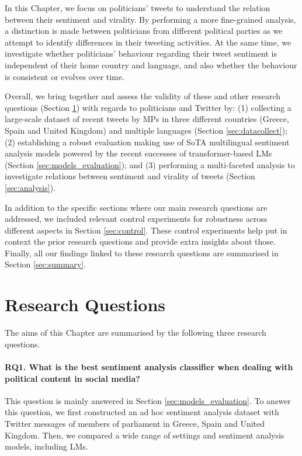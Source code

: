 In this Chapter, we focus on politicians' tweets to understand the relation between their sentiment and virality. By performing a more fine-grained analysis, a distinction is made between politicians from different political parties as we attempt to identify differences in their tweeting activities. At the same time, we investigate whether politicians' behaviour regarding their tweet sentiment is independent of their home country and language, and also whether the behaviour is consistent or evolves over time.

Overall, we bring together and assess the validity of these and other research questions (Section \ref{sec:rqs}) with regards to politicians and Twitter by: (1) collecting a large-scale dataset of recent tweets by \acp{MP} in three different countries (Greece, Spain and United Kingdom) and multiple languages (Section \ref{sec:datacollect}); (2) establishing a robust evaluation making use of \ac{SoTA} multilingual sentiment analysis models powered by the recent successes of transformer-based \acp{LM} (Section \ref{sec:models_evaluation}); and (3) performing a multi-faceted analysis to investigate relations between sentiment and virality of tweets (Section \ref{sec:analysis}).

In addition to the specific sections where our main research questions are addressed, we included relevant control experiments for robustness across different aspects in Section \ref{sec:control}. These control experiments help put in context the prior research questions and provide extra insights about those. Finally, all our findings linked to these research questions are summarised in Section \ref{sec:summary}.

\section{Research Questions}
\label{sec:rqs}

The aims of this Chapter are summarised by the following three research questions.

\paragraph{RQ1. What is the best sentiment analysis classifier when dealing with political content in social media?} This question is mainly answered in Section \ref{sec:models_evaluation}. To answer this question, we first constructed an ad hoc sentiment analysis dataset with Twitter messages of members of parliament in Greece, Spain and United Kingdom. Then, we compared a wide range of settings and sentiment analysis models, including \acp{LM}. 


